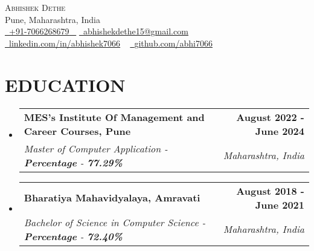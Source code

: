 \documentclass[letterpaper,11pt]{article}
\makeatletter
\newcommand{\resumeSubheading}[4]{
  \vspace{-2pt}\item
    \begin{tabular*}{1.0\textwidth}[t]{l@{\extracolsep{\fill}}r}
      \textbf{\large#1} & \textbf{\small #2} \\
      \textit{\large#3} & \textit{\small #4} \\
      
    \end{tabular*}\vspace{-7pt}
}
\newcommand{\resumeSubHeadingListStart}{\begin{itemize}[leftmargin=0.0in, label={}]}
\newcommand{\resumeSubHeadingListEnd}{\end{itemize}}
\makeatother
\begin{document}


\begin{center}
    {\Huge \scshape Abhishek Dethe} \\ \vspace{1pt}
    Pune, Maharashtra, India \\ \vspace{1pt}
     \small \href{tel:+917066268679}{ \raisebox{-0.1\height}\faPhone\ \underline{+91-7066268679} ~} \href{mailto:abhishekdethe15@gmail.com}{\raisebox{-0.2\height}\faEnvelope\  \underline{abhishekdethe15@gmail.com}}  ~ 
    \href{https://linkedin.com/in/abhishek7066/}{\raisebox{-0.2\height}\faLinkedinSquare\ \underline{linkedin.com/in/abhishek7066}}  ~
    \href{https://github.com/abhi7066}{\raisebox{-0.2\height}\faGithub\ \underline{github.com/abhi7066}} ~
    \vspace{-2pt}
\end{center}



\section{EDUCATION}
  \resumeSubHeadingListStart
    \resumeSubheading
      {MES's Institute Of Management and Career Courses, Pune}{August 2022 - June 2024}
      {Master of Computer Application - \textbf{Percentage} - \textbf{77.29\%}}{Maharashtra, India}
  \resumeSubHeadingListEnd
  
  \resumeSubHeadingListStart
    \resumeSubheading
      {Bharatiya Mahavidyalaya, Amravati}{August 2018 - June 2021}
      {Bachelor of Science in Computer Science  - \textbf{Percentage} - \textbf{72.40\%}}{Maharashtra, India}
  \resumeSubHeadingListEnd


\end{document}

